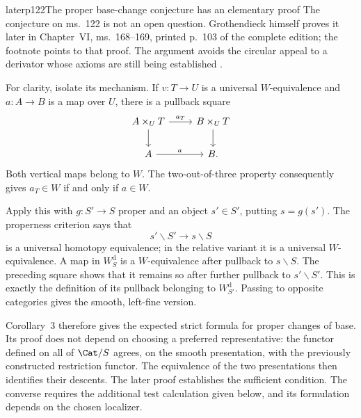 \begin{dcomment}{later}{p122}{The proper base-change conjecture has an elementary proof}
The conjecture on ms.~122 is not an open question. Grothendieck himself proves it later in Chapter~VI, ms.~168--169, printed p.~103 of the complete edition; the footnote points to that proof. The argument avoids the circular appeal to a derivator whose axioms are still being established \citep[ms.~168--169]{Grothendieck1990VI}.

For clarity, isolate its mechanism. If $v:T\to U$ is a universal $W$-equivalence and $a:A\to B$ is a map over $U$, there is a pullback square
\[
\begin{tikzcd}
A\times_U T\arrow[r,"a_T"]\arrow[d] & B\times_U T\arrow[d]\\
A\arrow[r,"a"] & B.
\end{tikzcd}
\]
Both vertical maps belong to $W$. The two-out-of-three property consequently gives $a_T\in W$ if and only if $a\in W$.

Apply this with $g:S'\to S$ proper and an object $s'\in S'$, putting $s=g(s')$. The properness criterion says that
\[
 s'\backslash S'\longrightarrow s\backslash S
\]
is a universal homotopy equivalence; in the relative variant it is a universal $W$-equivalence. A map in $W_S^{\mathrm d}$ is a $W$-equivalence after pullback to $s\backslash S$. The preceding square shows that it remains so after further pullback to $s'\backslash S'$. This is exactly the definition of its pullback belonging to $W_{S'}^{\mathrm d}$. Passing to opposite categories gives the smooth, left-fine version.

Corollary~3 therefore gives the expected strict formula for proper changes of base. Its proof does not depend on choosing a preferred representative: the functor defined on all of $\Cat/S$ agrees, on the smooth presentation, with the previously constructed restriction functor. The equivalence of the two presentations then identifies their descents. The later proof establishes the sufficient condition. The converse requires the additional test calculation given below, and its formulation depends on the chosen localizer.
\end{dcomment}

